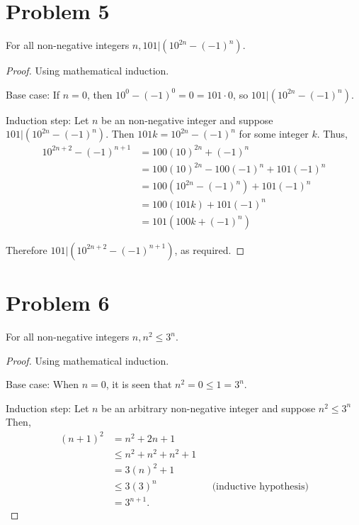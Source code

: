 \documentclass{article}
\begin{document}

    \section*{Problem 5}

    For all non-negative integers $n, 101|(10^{2n}-(-1)^n)$.

    \begin{proof}
        Using mathematical induction.

        Base case: If $n = 0$, then $10^0-(-1)^0 = 0 = 101\cdot 0$, so $101|(10^{2n}-(-1)^n)$.

        Induction step: Let $n$ be an non-negative integer and suppose $101|(10^{2n}-(-1)^n)$.
        Then $101k=10^{2n}-(-1)^n$ for some integer $k$. Thus,
        \begin{equation*}
            \begin{split}
                10^{2n+2}-(-1)^{n+1} & = 100(10)^{2n}+(-1)^n \\
                & = 100(10)^{2n}-100(-1)^n+101(-1)^n \\
                & = 100(10^{2n}-(-1)^n)+101(-1)^n \\
                & = 100(101k)+101(-1)^n \\
                & = 101(100k+(-1)^n)
            \end{split}
        \end{equation*}
        
        Therefore $101|(10^{2n+2}-(-1)^{n+1})$, as required.
    \end{proof}


    \section*{Problem 6}

    For all non-negative integers $n, n^2\leq 3^n$.
    
    \begin{proof}
        Using mathematical induction.

        Base case: When $n=0$, it is seen that $n^2 = 0 \leq 1 = 3^n$.

        Induction step: Let $n$ be an arbitrary non-negative integer and suppose $n^2\leq 3^n$
        Then,
        \begin{align*}
            (n+1)^2 & = n^2+2n+1 \\
            & \leq n^2 + n^2 + n^2+1 \\
            & = 3(n)^2+1 \\ 
            & \leq 3(3)^n && \text{(inductive hypothesis)} \\
            & = 3^{n+1}.
        \end{align*}
    \end{proof}
\end{document}
